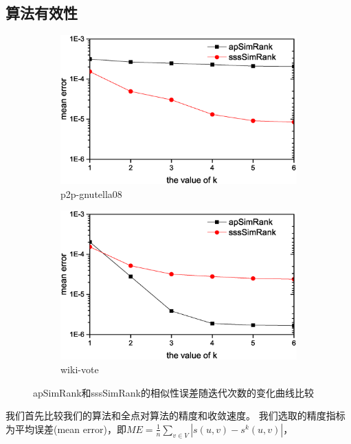 \documentclass[master]{njuthesis}
\begin{document}
\subsection{算法有效性}
\begin{figure}[h]
\centering
\begin{subfigure}[b]{0.48\textwidth}
	\center
	\includegraphics[width=1\textwidth]{figure/accuracy1.eps}
	\caption{p2p-gnutella08}
	\label{fig:ch1:effec:one}
\end{subfigure}
\begin{subfigure}[b]{0.48\textwidth}
	\centering
	\includegraphics[width=1\textwidth]{figure/accuracy2.eps}
	\caption{wiki-vote}
	\label{fig:ch1:effec:two}
\end{subfigure}
\label{fig:ch1:effec}
\caption{apSimRank和sssSimRank的相似性误差随迭代次数的变化曲线比较}
\end{figure}
我们首先比较我们的算法和全点对算法的精度和收敛速度。
我们选取的精度指标为平均误差(mean error)，即$ME = \frac{1}{n}\sum_{v \in V}{\left|s(u,v) - s^k(u,v)\right|}$，
\end{document}
